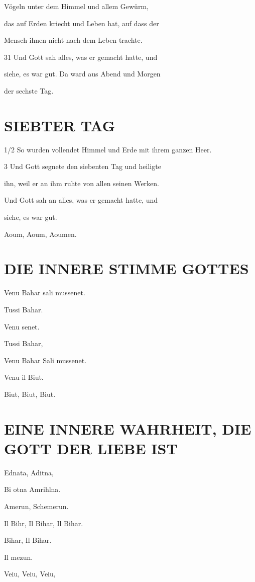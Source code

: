 \documentclass[11pt,a5paper,twoside]{article}
\begin{document}
Vögeln unter dem Himmel und allem Gewürm,

das auf Erden kriecht und Leben hat, auf dass der

Mensch ihnen nicht nach dem Leben trachte.

31 Und Gott sah alles, was er gemacht hatte, und

siehe, es war gut. Da ward aus Abend und Morgen

der sechste Tag.

\section[Siebter Tag]{SIEBTER TAG}

1/2 So wurden vollendet Himmel und Erde mit ihrem
ganzen Heer.

3 Und Gott segnete den siebenten Tag und heiligte

ihn, weil er an ihm ruhte von allen seinen Werken.

Und Gott sah an alles, was er gemacht hatte, und

siehe, es war gut.

Aoum, Aoum, Aoumen.

\section[Die innere Stimme Gottes]{DIE INNERE STIMME GOTTES}

Venu Bahar sali mussenet. 

Tussi Bahar.

Venu senet.

Tussi Bahar, 

Venu Bahar Sali mussenet.

Venu il Biut. 

Biut, Biut, Biut.

\section[Eine ewige Wahrheit, die Gott der Liebe ist]{EINE INNERE WAHRHEIT, DIE GOTT DER LIEBE IST}

Ednata, Aditna, 

Bi otna Amrihlna.

Amerun, Schemerun.

Il Bihr, Il Bihar, Il Bihar. 

Bihar, Il Bihar. 

Il mezun.


Veiu, Veiu, Veiu,
 
\end{document}
